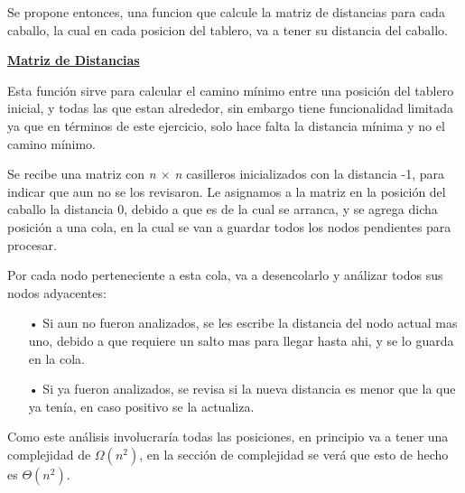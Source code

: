 \documentclass[10pt,a4paper]{article}
\begin{document}
\bigskip
Se propone entonces, una funcion que calcule la matriz de distancias para cada caballo, la cual en cada posicion del tablero, va a tener su distancia del caballo.

\bigskip

\noindent \underline{\textbf{Matriz de Distancias}}

Esta función sirve para calcular el camino mínimo entre una posición del tablero inicial, y todas las que estan alrededor, sin embargo tiene funcionalidad limitada ya que en términos de este ejercicio, solo hace falta la distancia mínima y no el camino mínimo.

Se recibe una matriz con \textit{n $\times$  n} casilleros inicializados con la distancia -1, para indicar que aun no se los revisaron. Le asignamos a la matriz en la posición del caballo la distancia 0, debido a que es de la cual se arranca, y se agrega dicha posición a una cola, en la cual se van a guardar todos los nodos pendientes para procesar. 

Por cada nodo perteneciente a esta cola, va a desencolarlo y análizar todos sus nodos adyacentes:
\begin{itemize}
\item[•]Si aun no fueron analizados, se les escribe la distancia del nodo actual mas uno, debido a que requiere un salto mas para llegar hasta ahi, y se lo guarda en la cola.
\item[•]Si ya fueron analizados, se revisa si la nueva distancia es menor que la que ya tenía, en caso positivo se la actualiza.
\end{itemize}

Como este análisis involucraría todas las posiciones, en principio va a tener una complejidad de $\Omega(n^2)$, en la sección de complejidad se verá que esto de hecho es $\Theta(n^2)$. 
\bigskip
\end{document}
